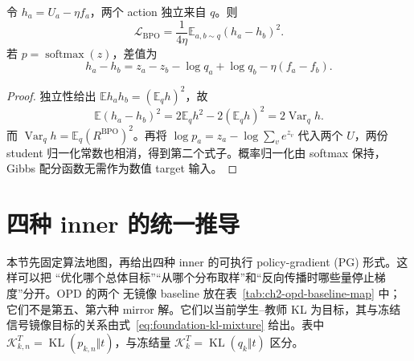 \documentclass[lang=cn,scheme=chinese,openany]{../book/elegantbook}
\newcommand{\E}{\mathbb E}
\newcommand{\KL}{\operatorname{KL}}
\newcommand{\Var}{\operatorname{Var}}
\begin{document}
\begin{proposition}[成对回归完全消去两个归一化常数]
\label{prop:quotient-pairwise}
令 $h_a=U_a-\eta f_a$，两个 action 独立来自 $q$。则
\begin{equation}
\mathcal L_{\mathrm{BPO}}=
\frac1{4\eta}\E_{a,b\sim q}(h_a-h_b)^2.
\end{equation}
若 $p=\operatorname{softmax}(z)$，差值为
\begin{equation}
h_a-h_b=z_a-z_b-\log q_a+\log q_b-\eta(f_a-f_b).
\end{equation}
\end{proposition}
\begin{proof}
独立性给出 $\E h_ah_b=(\E_qh)^2$，故
\begin{equation}
\E(h_a-h_b)^2=2\E_qh^2-2(\E_qh)^2=2\Var_qh.
\end{equation}
而 $\Var_qh=\E_q(R^{\mathrm{BPO}})^2$。再将 $\log p_a=z_a-\log\sum_v e^{z_v}$ 代入两个 $U$，两份 student 归一化常数也相消，得到第二个式子。概率归一化由 softmax 保持，Gibbs 配分函数无需作为数值 target 输入。
\end{proof}



\section{四种 inner 的统一推导}
\label{sec:ch2-four-methods}

本节先固定算法地图，再给出四种 inner 的可执行 policy-gradient (PG) 形式。这样可以把
“优化哪个总体目标”“从哪个分布取样”和“反向传播时哪些量停止梯度”分开。OPD 的两个
无镜像 baseline 放在表~\ref{tab:ch2-opd-baseline-map} 中；它们不是第五、第六种
mirror 解。它们以当前学生--教师 KL 为目标，其与冻结信号镜像目标的关系由式~\eqref{eq:foundation-kl-mixture} 给出。表中 $\mathcal K_{k,n}^{T}=\KL(p_{k,n}\Vert t)$，与冻结量 $\mathcal K_k^T=\KL(q_k\Vert t)$ 区分。
\end{document}
